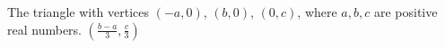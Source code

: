 {The triangle with vertices $(-a,0)$, $(b,0)$, $(0,c)$, where $a,b,c$ are positive real numbers.
}
{$\left(\frac{b-a}{3},\frac{c}{3}\right)$
}
